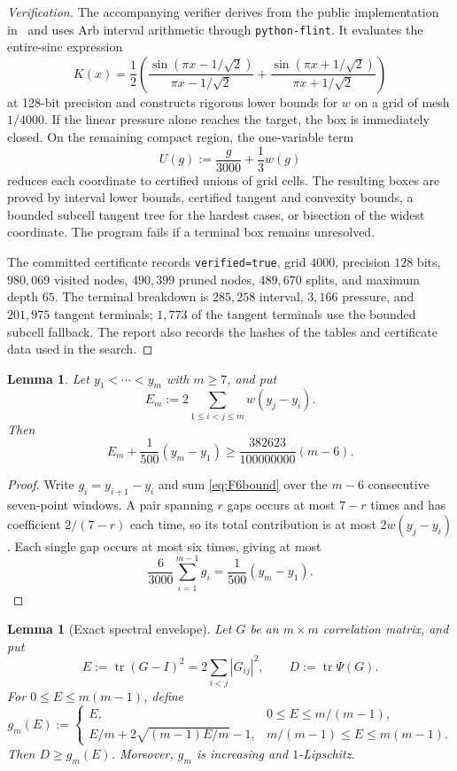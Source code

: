 \documentclass[11pt]{article}
\newtheorem{lemma}[theorem]{Lemma}
\DeclareMathOperator{\tr}{tr}
\begin{document}
\begin{proof}[Verification]
The accompanying verifier derives from the public implementation
in~\cite{Ainta26} and uses Arb interval arithmetic through
\texttt{python-flint}.  It evaluates
the entire-sinc expression
\[
 K(x)=\frac12\left(
 \frac{\sin(\pi x-1/\sqrt2)}{\pi x-1/\sqrt2}
 +\frac{\sin(\pi x+1/\sqrt2)}{\pi x+1/\sqrt2}
 \right)
\]
at 128-bit precision and constructs rigorous lower bounds for $w$ on a grid
of mesh $1/4000$.  If the linear pressure alone reaches the target, the box
is immediately closed.  On the remaining compact region, the one-variable term
\[
 U(g):=\frac g{3000}+\frac13w(g)
\]
reduces each coordinate to certified unions of grid cells.  The resulting
boxes are proved by interval lower bounds, certified tangent and convexity
bounds, a bounded subcell tangent tree for the hardest cases, or bisection of
the widest coordinate.  The program fails if a terminal box remains
unresolved.

The committed certificate records \texttt{verified=true}, grid $4000$,
precision $128$ bits, $980{,}069$ visited nodes, $490{,}399$ pruned nodes,
$489{,}670$ splits, and maximum depth $65$.  The terminal breakdown is
$285{,}258$ interval, $3{,}166$ pressure, and $201{,}975$ tangent terminals;
$1{,}773$ of the tangent terminals use the bounded subcell fallback.  The
report also records the hashes of the
tables and certificate data used in the search.
\end{proof}

\begin{lemma}\label{lem:block-energy}
Let $y_1<\cdots<y_m$ with $m\ge7$, and put
\[
 E_m:=2\sum_{1\le i<j\le m}w(y_j-y_i).
\]
Then
\begin{equation}\label{eq:block-energy}
 E_m+\frac1{500}(y_m-y_1)
 \ge\frac{382623}{100000000}(m-6).
\end{equation}
\end{lemma}

\begin{proof}
Write $g_i=y_{i+1}-y_i$ and sum \eqref{eq:F6bound} over the $m-6$
consecutive seven-point windows.  A pair spanning $r$ gaps occurs at most
$7-r$ times and has coefficient $2/(7-r)$ each time, so its total
contribution is at most $2w(y_j-y_i)$.  Each single gap occurs at most six
times, giving at most
\[
 \frac6{3000}\sum_{i=1}^{m-1}g_i
 =\frac1{500}(y_m-y_1).
\]
\end{proof}

\begin{lemma}[Exact spectral envelope]\label{lem:spectral-envelope}
Let $G$ be an $m\times m$ correlation matrix, and put
\[
 E:=\tr(G-I)^2=2\sum_{i<j}|G_{ij}|^2,
 \qquad D:=\tr\Psi(G).
\]
For $0\le E\le m(m-1)$, define
\begin{equation}\label{eq:gm}
 g_m(E):=
 \begin{cases}
 E,&0\le E\le m/(m-1),\\
 E/m+2\sqrt{(m-1)E/m}-1,
   &m/(m-1)\le E\le m(m-1).
 \end{cases}
\end{equation}
Then $D\ge g_m(E)$.  Moreover, $g_m$ is increasing and $1$-Lipschitz.
\end{lemma}
\end{document}
